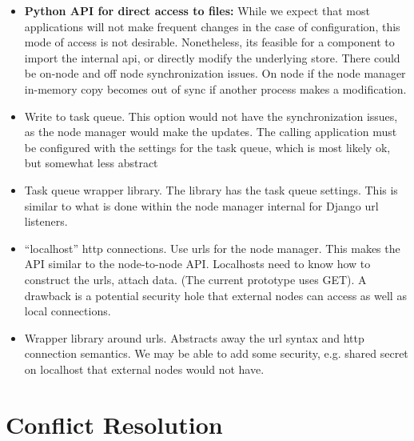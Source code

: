 \documentclass[oneside,12pt]{memoir}
\begin{document}
\begin{itemize}
\item \textbf{Python API for direct access to files:}  While we expect that most applications will not make frequent changes in the case of configuration, this mode of access is not desirable.  Nonetheless, its feasible for a component to import the internal api, or directly modify the underlying store.  There could be on-node and off node synchronization issues.  On node if the node manager in-memory copy becomes out of sync if another process makes a modification.  
\item Write to task queue. This option would not have the synchronization issues, as the node manager would make the updates.  The calling application must be configured with the settings for the task queue, which is most likely ok, but somewhat less abstract
\item Task queue wrapper library.  The library has the task queue settings.  This is similar to what is done within the node manager internal for Django url listeners.
\item ``localhost'' http connections.  Use urls for the node manager.  This makes the API similar to the node-to-node API.   Localhosts need to know how to construct the urls, attach data. (The current prototype uses GET).  A drawback is a potential security hole that external nodes can access as well as local connections.
\item Wrapper library around urls.  Abstracts away the url syntax and http connection semantics.  We may be able to add some security, e.g. shared secret on localhost that external nodes would not have.

\end{itemize}


\section{Conflict Resolution}
\end{document}
